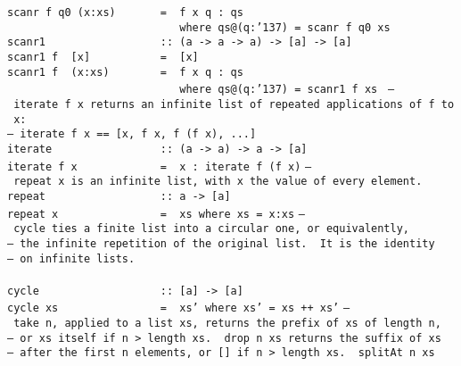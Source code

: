 \mbox{\tt scanr\ f\ q0\ (x:xs)\ \ \ \ \ \ \ =\ \ f\ x\ q\ :\ qs}\\
\mbox{\tt \ \ \ \ \ \ \ \ \ \ \ \ \ \ \ \ \ \ \ \ \ \ \ \ \ \ \ where\ qs@(q:{\char'137})\ =\ scanr\ f\ q0\ xs\ }
%
\eprogB\noindent\bprogB
\mbox{\tt scanr1\ \ \ \ \ \ \ \ \ \ \ \ \ \ \ \ \ \ ::\ (a\ ->\ a\ ->\ a)\ ->\ [a]\ ->\ [a]}\\
\mbox{\tt scanr1\ f\ \ [x]\ \ \ \ \ \ \ \ \ \ \ =\ \ [x]}\\
\mbox{\tt scanr1\ f\ \ (x:xs)\ \ \ \ \ \ \ \ =\ \ f\ x\ q\ :\ qs}\\
\mbox{\tt \ \ \ \ \ \ \ \ \ \ \ \ \ \ \ \ \ \ \ \ \ \ \ \ \ \ \ where\ qs@(q:{\char'137})\ =\ scanr1\ f\ xs\ }
%
\eprogB\noindent\bprogB
\mbox{\tt --\ iterate\ f\ x\ returns\ an\ infinite\ list\ of\ repeated\ applications\ of\ f\ to\ x:}\\
\mbox{\tt --\ iterate\ f\ x\ ==\ [x,\ f\ x,\ f\ (f\ x),\ ...]}\\
\mbox{\tt iterate\ \ \ \ \ \ \ \ \ \ \ \ \ \ \ \ \ ::\ (a\ ->\ a)\ ->\ a\ ->\ [a]}\\
\mbox{\tt iterate\ f\ x\ \ \ \ \ \ \ \ \ \ \ \ \ =\ \ x\ :\ iterate\ f\ (f\ x)}
%
\eprogB\noindent\bprogB
\mbox{\tt --\ repeat\ x\ is\ an\ infinite\ list,\ with\ x\ the\ value\ of\ every\ element.}\\
\mbox{\tt repeat\ \ \ \ \ \ \ \ \ \ \ \ \ \ \ \ \ \ ::\ a\ ->\ [a]}\\
\mbox{\tt repeat\ x\ \ \ \ \ \ \ \ \ \ \ \ \ \ \ \ =\ \ xs\ where\ xs\ =\ x:xs}
%
\eprogB\noindent\bprogB
\mbox{\tt --\ cycle\ ties\ a\ finite\ list\ into\ a\ circular\ one,\ or\ equivalently,}\\
\mbox{\tt --\ the\ infinite\ repetition\ of\ the\ original\ list.\ \ It\ is\ the\ identity}\\
\mbox{\tt --\ on\ infinite\ lists.}\\
\mbox{\tt }\\[-8pt]
\mbox{\tt cycle\ \ \ \ \ \ \ \ \ \ \ \ \ \ \ \ \ \ \ ::\ [a]\ ->\ [a]}\\
\mbox{\tt cycle\ xs\ \ \ \ \ \ \ \ \ \ \ \ \ \ \ \ =\ \ xs'\ where\ xs'\ =\ xs\ ++\ xs'}
%
\eprogB\noindent\bprogB
\mbox{\tt --\ take\ n,\ applied\ to\ a\ list\ xs,\ returns\ the\ prefix\ of\ xs\ of\ length\ n,}\\
\mbox{\tt --\ or\ xs\ itself\ if\ n\ >\ length\ xs.\ \ drop\ n\ xs\ returns\ the\ suffix\ of\ xs}\\
\mbox{\tt --\ after\ the\ first\ n\ elements,\ or\ []\ if\ n\ >\ length\ xs.\ \ splitAt\ n\ xs}\\
